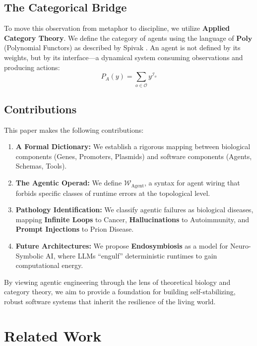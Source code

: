 \documentclass[11pt, a4paper]{article}
\newcommand{\Poly}{\mathbf{Poly}}
\newcommand{\Operad}{\mathcal{W}_{\text{Agent}}}
\begin{document}
\subsection{The Categorical Bridge}
To move this observation from metaphor to discipline, we utilize \textbf{Applied Category Theory}. We define the category of agents using the language of $\Poly$ (Polynomial Functors) as described by Spivak \cite{spivak2021learners}. An agent is not defined by its weights, but by its interface---a dynamical system consuming observations and producing actions:
\begin{equation}
    P_A(y) = \sum_{o \in \mathcal{O}} y^{\mathcal{I}_o}
\end{equation}

\subsection{Contributions}
This paper makes the following contributions:
\begin{enumerate}
    \item \textbf{A Formal Dictionary:} We establish a rigorous mapping between biological components (Genes, Promoters, Plasmids) and software components (Agents, Schemas, Tools).
    \item \textbf{The Agentic Operad:} We define $\Operad$, a syntax for agent wiring that forbids specific classes of runtime errors at the topological level.
    \item \textbf{Pathology Identification:} We classify agentic failures as biological diseases, mapping \textbf{Infinite Loops} to Cancer, \textbf{Hallucinations} to Autoimmunity, and \textbf{Prompt Injections} to Prion Disease.
    \item \textbf{Future Architectures:} We propose \textbf{Endosymbiosis} as a model for Neuro-Symbolic AI, where LLMs ``engulf'' deterministic runtimes to gain computational energy.
\end{enumerate}


By viewing agentic engineering through the lens of theoretical biology and category theory, we aim to provide a foundation for building self-stabilizing, robust software systems that inherit the resilience of the living world.

\section{Related Work}
\end{document}
